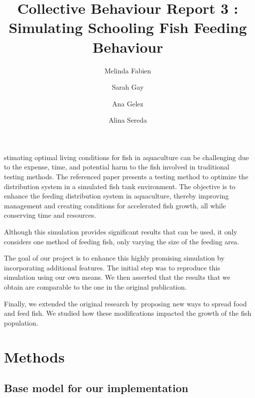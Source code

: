 \documentclass[9pt]{pnas-new}
\title{Collective Behaviour Report 3 : Simulating Schooling Fish Feeding Behaviour}
\author{Melinda Fabien}
\author{Sarah Gay}
\author{Ana Gelez}
\author{Alina Sereda}
\affil{Collective behaviour course research seminar report}
\begin{document}
\verticaladjustment{-2pt}

\maketitle
\thispagestyle{firststyle}

stimating optimal living conditions for fish in aquaculture can be challenging due to the expense, time, and potential harm to the fish involved in traditional testing methods. 
The referenced paper \cite{article} presents a testing method to optimize the distribution system in a simulated fish tank environment. The objective is to enhance the feeding distribution system in aquaculture, thereby improving management and creating conditions for accelerated fish growth, all while conserving time and resources.

Although this simulation provides significant results that can be used, it only considers one method of feeding fish, only varying the size of the feeding area.

The goal of our project is to enhance this highly promising simulation by incorporating additional features. The initial step was to reproduce this simulation using our own means. We then asserted that the results that we obtain are comparable to the one in the original publication.

Finally, we extended the original research by proposing new ways to spread food and feed fish. We studied how these modifications impacted the growth of the fish population.

\section*{Methods}

\subsection{Base model for our implementation}
\end{document}
